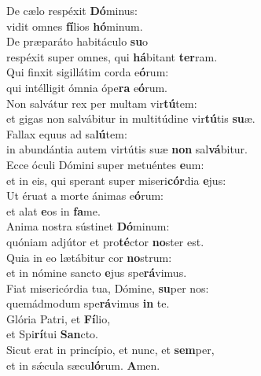 \evenverse De cælo respéxit \textbf{Dó}minus:~\*\\
\evenverse vidit omnes \textbf{fí}lios \textbf{hó}minum.\\
\oddverse De præparáto habitáculo \textbf{su}o~\*\\
\oddverse respéxit super omnes, qui \textbf{há}bitant \textbf{ter}ram.\\
\evenverse Qui finxit sigillátim corda e\textbf{ó}rum:~\*\\
\evenverse qui intélligit ómnia ópe\textbf{ra} e\textbf{ó}rum.\\
\oddverse Non salvátur rex per multam vir\textbf{tú}tem:~\*\\
\oddverse et gigas non salvábitur in multitúdine vir\textbf{tú}tis \textbf{su}æ.\\
\evenverse Fallax equus ad sa\textbf{lú}tem:~\*\\
\evenverse in abundántia autem virtútis suæ \textbf{non} sal\textbf{vá}bitur.\\
\oddverse Ecce óculi Dómini super metuéntes \textbf{e}um:~\*\\
\oddverse et in eis, qui sperant super miseri\textbf{cór}dia \textbf{e}jus:\\
\evenverse Ut éruat a morte ánimas e\textbf{ó}rum:~\*\\
\evenverse et alat \textbf{e}os in \textbf{fa}me.\\
\oddverse Anima nostra sústinet \textbf{Dó}minum:~\*\\
\oddverse quóniam adjútor et pro\textbf{té}ctor \textbf{no}ster est.\\
\evenverse Quia in eo lætábitur cor \textbf{no}strum:~\*\\
\evenverse et in nómine sancto \textbf{e}jus spe\textbf{rá}vimus.\\
\oddverse Fiat misericórdia tua, Dómine, \textbf{su}per nos:~\*\\
\oddverse quemádmodum spe\textbf{rá}vimus \textbf{in} te.\\
\evenverse Glória Patri, et \textbf{Fí}lio,~\*\\
\evenverse et Spi\textbf{rí}tui \textbf{San}cto.\\
\oddverse Sicut erat in princípio, et nunc, et \textbf{sem}per,~\*\\
\oddverse et in sǽcula sæcu\textbf{ló}rum. \textbf{A}men.\\
